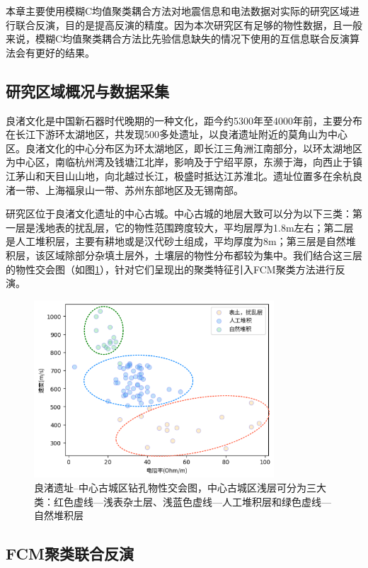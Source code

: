 本章主要使用模糊C均值聚类耦合方法对地震信息和电法数据对实际的研究区域进行联合反演，目的是提高反演的精度。因为本次研究区有足够的物性数据，且一般来说，模糊C均值聚类耦合方法比先验信息缺失的情况下使用的互信息联合反演算法会有更好的结果。

\subsection{研究区域概况与数据采集}

良渚文化是中国新石器时代晚期的一种文化，距今约5300年至4000年前，主要分布在长江下游环太湖地区，共发现500多处遗址，以良渚遗址附近的莫角山为中心区。良渚文化的中心分布区为环太湖地区，即长江三角洲江南部分，以环太湖地区为中心区，南临杭州湾及钱塘江北岸，影响及于宁绍平原，东濒于海，向西止于镇江茅山和天目山山地，向北越过长江，极盛时抵达江苏淮北。遗址位置多在余杭良渚一带、上海福泉山一带、苏州东部地区及无锡南部。

研究区位于良渚文化遗址的中心古城。中心古城的地层大致可以分为以下三类：第一层是浅地表的扰乱层，它的物性范围跨度较大，平均层厚为1.8m左右；第二层是人工堆积层，主要有耕地或是汉代砂土组成，平均厚度为8m；第三层是自然堆积层，该区域除部分杂填土层外，土壤层的物性分布都较为集中。我们结合这三层的物性交会图（如图\ref{fig:pro_intersection}），针对它们呈现出的聚类特征引入FCM聚类方法进行反演。

\begin{figure}[h]
    \centering
    \includegraphics[width=0.8\textwidth]{figure/thesis/output_revised.png}
    \caption{良渚遗址--中心古城区钻孔物性交会图，中心古城区浅层可分为三大类：红色虚线—浅表杂土层、浅蓝色虚线—人工堆积层和绿色虚线—自然堆积层}
    \label{fig:pro_intersection}
\end{figure}

\subsection{FCM聚类联合反演}

